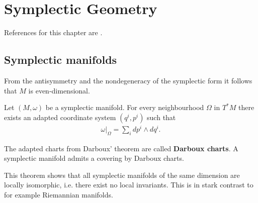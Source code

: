\chapter{Symplectic Geometry}\label{chapter:symplectic}

    References for this chapter are \cite{mcduff, symplectic}.

\section{Symplectic manifolds}


    \begin{property}[Dimension]
        From the antisymmetry and the nondegeneracy of the symplectic form it follows that $M$ is even-dimensional.
    \end{property}

    \begin{theorem}[Darboux]
        Let $(M, \omega)$ be a symplectic manifold. For every neighbourhood $\Omega$ in $T^*M$ there exists an adapted coordinate system $(q^i, p^i)$ such that
        \begin{gather}
            \left.\omega\right|_\Omega = \sum_idp^i\wedge dq^i.
        \end{gather}
    \end{theorem}
    The adapted charts from Darboux' theorem are called \textbf{Darboux charts}. A symplectic manifold admits a covering by Darboux charts.
    \begin{remark}
        This theorem shows that all symplectic manifolds of the same dimension are locally isomorphic, i.e. there exist no local invariants. This is in stark contrast to for example Riemannian manifolds.
    \end{remark}

